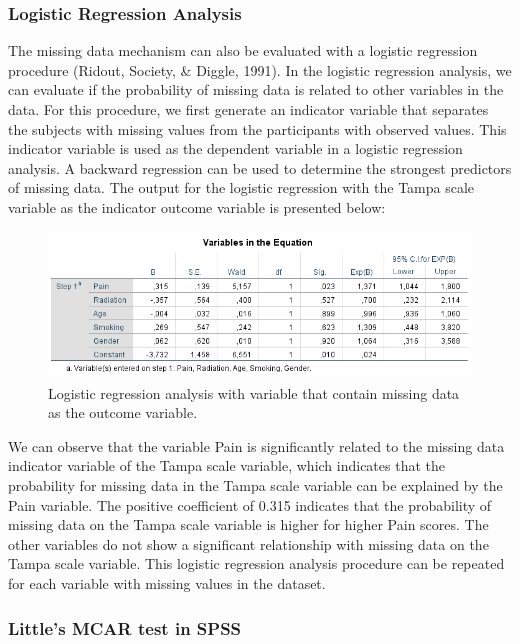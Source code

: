 \documentclass[]{book}
\begin{document}
\subsubsection{Logistic Regression
Analysis}\label{logistic-regression-analysis}

The missing data mechanism can also be evaluated with a logistic
regression procedure (Ridout, Society, \& Diggle, 1991). In the logistic
regression analysis, we can evaluate if the probability of missing data
is related to other variables in the data. For this procedure, we first
generate an indicator variable that separates the subjects with missing
values from the participants with observed values. This indicator
variable is used as the dependent variable in a logistic regression
analysis. A backward regression can be used to determine the strongest
predictors of missing data. The output for the logistic regression with
the Tampa scale variable as the indicator outcome variable is presented
below:

\begin{figure}

{\centering \includegraphics[width=0.9\linewidth]{images/tab2.6} 

}

\caption{Logistic regression analysis with variable that contain missing data as the outcome variable.}\label{fig:tab6}
\end{figure}

We can observe that the variable Pain is significantly related to the
missing data indicator variable of the Tampa scale variable, which
indicates that the probability for missing data in the Tampa scale
variable can be explained by the Pain variable. The positive coefficient
of 0.315 indicates that the probability of missing data on the Tampa
scale variable is higher for higher Pain scores. The other variables do
not show a significant relationship with missing data on the Tampa scale
variable. This logistic regression analysis procedure can be repeated
for each variable with missing values in the dataset.

\subsubsection{Little's MCAR test in
SPSS}\label{littles-mcar-test-in-spss}
\end{document}
